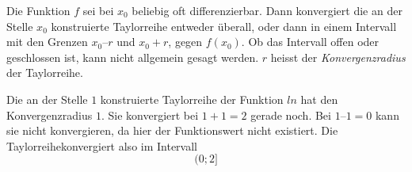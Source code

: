 \documentclass[10pt,a4paper]{article}
\begin{document}
Die Funktion $f$ sei bei $x_0$ beliebig oft differenzierbar. Dann konvergiert die an der Stelle $x_0$ konstruierte Taylorreihe entweder überall, oder dann in einem Intervall mit den Grenzen $x_0 – r$ und $x_0 + r$, gegen $f(x_0)$. Ob das Intervall offen oder geschlossen ist, kann nicht allgemein gesagt werden. $r$ heisst der \textit{Konvergenzradius} der Taylorreihe.

Die an der Stelle $1$ konstruierte Taylorreihe der Funktion $ln$ hat den Konvergenzradius $1$. Sie konvergiert bei $1 + 1 = 2$ gerade noch. Bei $1 – 1 = 0$ kann sie nicht konvergieren, da hier der Funktionswert nicht existiert. Die Taylorreihekonvergiert also im Intervall $$(0;2]$$
\end{document}
